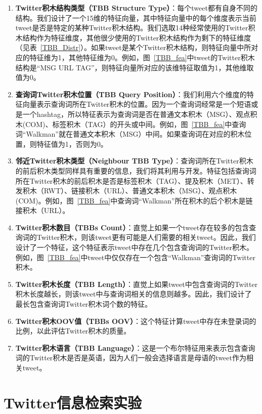 \begin{enumerate}
\item {\bf Twitter积木结构类型（TBB Structure Type）}：每个tweet都有自身不同的结构。我们设计了一个15维的特征向量，其中特征向量中的每个维度表示当前tweet是否是特定的某种Twitter积木结构。我们选取14种经常使用的Twitter积木结构作为特征维度，其他很少使用的Twitter积木结构作为剩下的特征维度（见表~\ref{TBB_Distr}）。如果tweet是某个Twitter积木结构，则特征向量中所对应的特征维为1，其他特征维为0。例如，图~\ref{TBB_fea}中tweet的Twitter积木结构是“MSG URL TAG”，则特征向量所对应的该维特征取值为1，其他维取值为0。
\item {\bf 查询词Twitter积木位置（TBB Query Position）}：我们利用六个维度的特征向量表示查询词所在Twitter积木的位置。因为一个查询词经常是一个短语或是一个hashtag，所以特征表示为查询词是否在普通文本积木（MSG）、观点积木(COM)、标签积木（TAG）的开头或中间。例如，图~\ref{TBB_fea}中查询词“Walkman”就在普通文本积木（MSG）中间。如果查询词在对应的积木位置，则特征值为1，否则为0。
\item {\bf 邻近Twitter积木类型（Neighbour TBB Type）}：查询词所在Twitter积木的前后积木类型同样具有重要的信息，我们将其利用与开发。特征包括查询词所在Twitter积木的前后积木是否是标签积木（TAG）、提及积木（MET）、转发积木（RWT）、链接积木（URL）、普通文本积木（MSG）、观点积木(COM)。例如，图~\ref{TBB_fea}中查询词“Walkman”所在积木的后个积木是链接积木（URL）。
\item {\bf Twitter积木数目（TBBs Count）}：直觉上如果一个tweet存在较多的包含查询词的Twitter积木，则该tweet更有可能是人们需要的相关tweet。因此，我们设计了一个特征，这个特征表示tweet中存在几个包含查询词的Twitter积木。例如，图~\ref{TBB_fea}中tweet中仅仅存在一个包含“Walkman”查询词的Twitter积木。
\item {\bf Twitter积木长度（TBB Length）}：直觉上如果tweet中包含查询词的Twitter积木长度越长，则该tweet中与查询词相关的信息则越多。因此，我们设计了最长包含查询词Twitter积木词个数的特征。
\item {\bf Twitter积木OOV值（TBBs OOV）}：这个特征计算tweet中存在未登录词的比例，以此评估Twitter积木的质量。
\item {\bf Twitter积木语言（TBB Language）}：这是一个布尔特征用来表示包含查询词的Twitter积木是否是英语，因为人们一般会选择语言是母语的tweet作为相关tweet。
 \end{enumerate} 
 
\section{Twitter信息检索实验}
